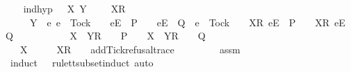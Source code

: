 \begin{isabellebody}
\ \ \isamarkupfalse%
\ ind{\isacharunderscore}hyp{\isacharcolon}\ {\isachardoublequoteopen}{\isasymforall}{\isasymrho}{\isacharprime}\ {\isasymsigma}\ X\ Y{\isachardot}\ {\isasymrho}\ {\isacharequal}\ {\isasymrho}{\isacharprime}\ {\isacharat}\ {\isacharbrackleft}X{\isacharbrackright}\isactrlsub R\ {\isacharhash}\ {\isasymsigma}\isanewline
\ \ \ \ {\isasymand}\ Y\ {\isasyminter}\ {\isacharbraceleft}e{\isachardot}\ e\ {\isasymnoteq}\ Tock\ {\isasymand}\ {\isasymrho}{\isacharprime}\ {\isacharat}\ {\isacharbrackleft}{\isacharbrackleft}e{\isacharbrackright}\isactrlsub E{\isacharbrackright}\ {\isasymin}\ P\ {\isasymand}\ {\isasymrho}{\isacharprime}\ {\isacharat}\ {\isacharbrackleft}{\isacharbrackleft}e{\isacharbrackright}\isactrlsub E{\isacharbrackright}\ {\isasymin}\ Q\ {\isasymor}\ e\ {\isacharequal}\ Tock\ {\isasymand}\ {\isasymrho}{\isacharprime}\ {\isacharat}\ {\isacharbrackleft}{\isacharbrackleft}X{\isacharbrackright}\isactrlsub R{\isacharcomma}\ {\isacharbrackleft}e{\isacharbrackright}\isactrlsub E{\isacharbrackright}\ {\isasymin}\ P\ {\isasymand}\ {\isasymrho}{\isacharprime}\ {\isacharat}\ {\isacharbrackleft}{\isacharbrackleft}X{\isacharbrackright}\isactrlsub R{\isacharcomma}\ {\isacharbrackleft}e{\isacharbrackright}\isactrlsub E{\isacharbrackright}\ {\isasymin}\ Q{\isacharbraceright}\ {\isacharequal}\ {\isacharbraceleft}{\isacharbraceright}\ {\isasymlongrightarrow}\isanewline
\ \ \ \ \ \ {\isasymrho}{\isacharprime}\ {\isacharat}\ {\isacharbrackleft}X\ {\isasymunion}\ Y{\isacharbrackright}\isactrlsub R\ {\isacharhash}\ {\isasymsigma}\ {\isasymin}\ P\ {\isasymand}\ {\isasymrho}{\isacharprime}\ {\isacharat}\ {\isacharbrackleft}X\ {\isasymunion}\ Y{\isacharbrackright}\isactrlsub R\ {\isacharhash}\ {\isasymsigma}\ {\isasymin}\ Q{\isachardoublequoteclose}\isanewline
\ \ \isamarkupfalse%
\ {\isachardoublequoteopen}{\isasymexists}\ {\isasymrho}{\isacharprime}{\isacharprime}\ X{\isacharprime}\ {\isasymsigma}{\isacharprime}{\isachardot}\ {\isasymrho}\ {\isacharequal}\ {\isasymrho}{\isacharprime}{\isacharprime}\ {\isacharat}\ {\isacharbrackleft}X{\isacharprime}{\isacharbrackright}\isactrlsub R\ {\isacharhash}\ {\isasymsigma}{\isacharprime}\ {\isasymand}\ add{\isacharunderscore}Tick{\isacharunderscore}refusal{\isacharunderscore}trace\ {\isasymrho}{\isacharprime}{\isacharprime}\ {\isacharequal}\ {\isasymrho}{\isacharprime}{\isachardoublequoteclose}\isanewline
\ \ \ \ \isamarkupfalse%
\ assm{}\ \isamarkupfalse%
\ {\isacharparenleft}induct\ {\isasymrho}\ {\isasymrho}{\isacharprime}\ rule{\isacharcolon}tt{\isacharunderscore}subset{\isachardot}induct{\isacharcomma}\ auto{\isacharparenright}\isanewline

\end{isabellebody}
